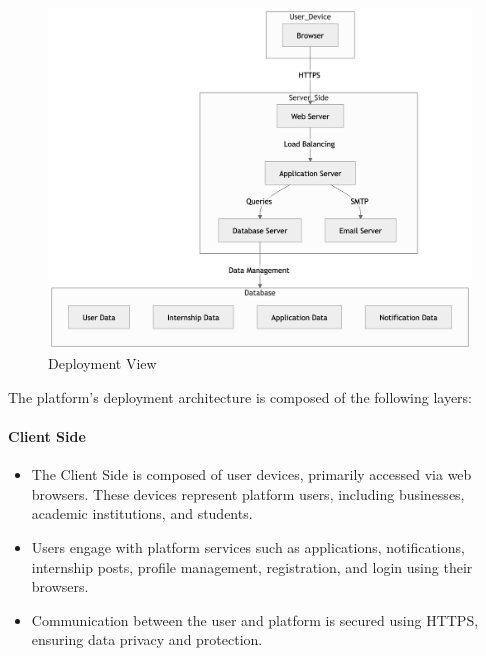 \begin{figure}[H]
    \begin{center}
        \includegraphics[width=0.82\linewidth]{JhaBhatiaSharma/imagesDD/DeploymentView.png}
        \caption{Deployment View}
        \label{fig:deploymentview}%
    \end{center}
\end{figure}
The platform's deployment architecture is composed of the following layers:

\paragraph{Client Side}
\begin{itemize}
    \item The Client Side is composed of user devices, primarily accessed via web browsers. These devices represent platform users, including businesses, academic institutions, and students.
    \item Users engage with platform services such as applications, notifications, internship posts, profile management, registration, and login using their browsers.
    \item Communication between the user and platform is secured using HTTPS, ensuring data privacy and protection.
\end{itemize}

